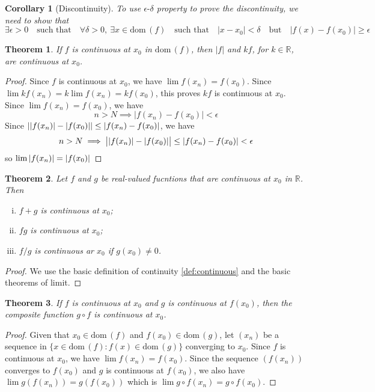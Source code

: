 \documentclass[12pt, lettersize]{book}
\theoremstyle{plain}
\newtheorem{thm}{Theorem}[section]
\newtheorem{cor}{Corollary}[thm]
\theoremstyle{definition}
\theoremstyle{remark}
\newcommand{\R}{\mathbb{R}}
\newcommand{\dom}{\text{dom}\,}
\begin{document}
			\begin{cor}[Discontinuity]
			To use $\epsilon\text{-}\delta$ property to prove the discontinuity, we need to show that
			\begin{displaymath}
				\exists\epsilon>0\quad\text{such that}\quad\forall\delta>0,\ \exists x\in\dom(f)\quad\text{such that}\quad |x-x_0|<\delta\quad\text{but}\quad|f(x)-f(x_0)|\geq\epsilon
			\end{displaymath}
			\end{cor}
			
			\begin{thm}\label{def:17.3}
			If $f$ is continuous at $x_0$ in $\dom(f)$, then $|f|$ and $kf$, for $k\in\R$, are continuous at $x_0$.
			\end{thm}
			\begin{proof}
			Since $f$ is continuous at $x_0$, we have $\lim f(x_n)=f(x_0)$. Since $\lim kf(x_n)=k\lim f(x_n)=kf(x_0)$, this
			proves $kf$ is continuous at $x_0$.
			Since $\lim f(x_n)=f(x_0)$, we have 
			\begin{displaymath}
				n>N\implies|f(x_n)-f(x_0)|<\epsilon
			\end{displaymath}
			Since $\abs{\abs{f(x_n)}-\abs{f(x_0)}}\leq\abs{f(x_n)-f(x_0)}$, we have 
			\begin{displaymath}
				n>N\implies\big|\abs{f(x_n)}-\abs{f(x_0)}\big|\leq\abs{f(x_n)-f(x_0)}<\epsilon
			\end{displaymath}
			so $\lim \abs{f(x_n)}=\abs{f(x_0)}$
			\end{proof}
			
			\begin{thm}\label{def:17.4}
			Let $f$ and $g$ be real-valued fucntions that are continuous at $x_0$ in $\R$. Then
			\begin{enumerate}[(i)]
				\item $f+g$ is continuous at $x_0$;
				\item $fg$ is continuous at $x_0$;
				\item $f/g$ is continuous ar $x_0$ if $g(x_0)\neq0$.
			\end{enumerate}
			\end{thm}
			\begin{proof}
			We use the basic definition of continuity \ref{def:continuous} and the basic theorems of limit.
			\end{proof}
			
			\begin{thm}\label{def:17.5}
			If $f$ is continuous at $x_0$ and $g$ is continuous at $f(x_0)$, then the composite function $g\circ f$ is
			continuous at $x_0$.
			\end{thm}
			\begin{proof}
			Given that $x_0\in\dom(f)$ and $f(x_0)\in\dom(g)$, let $(x_n)$ be a sequence in $\{x\in\dom(f): f(x)\in\dom(g)\}$
			converging to $x_0$. Since $f$ is continuous at $x_0$, we have $\lim f(x_n)=f(x_0)$. Since the sequence $(f(x_n))$ converges to $f(x_0)$ and $g$ is continuous at $f(x_0)$, we also have $\lim g(f(x_n))=g(f(x_0))$ which
			is $\lim g\circ f(x_n)=g\circ f(x_0)$.
			\end{proof}
			
\end{document}
